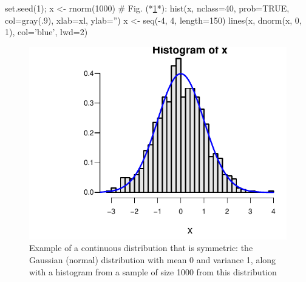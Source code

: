 \begin{Schunk}
\begin{Sinput}
set.seed(1); x <- rnorm(1000)   # Fig. (*\ref{fig:descript-normalhist}*):
hist(x, nclass=40, prob=TRUE, col=gray(.9), xlab=xl, ylab='')
x <- seq(-4, 4, length=150)
lines(x, dnorm(x, 0, 1), col='blue', lwd=2)
\end{Sinput}
\begin{figure}[htbp]

\centerline{\includegraphics{descript-normalhist-1} }

\caption[Symmetric continuous distribution]{Example of a continuous distribution that is symmetric: the Gaussian (normal) distribution with mean 0 and variance 1, along with a histogram from a sample of size 1000 from this distribution}\label{fig:descript-normalhist}
\end{figure}
\end{Schunk}

